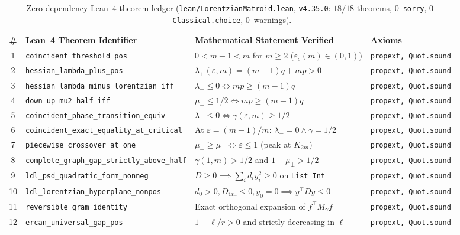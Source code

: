 \documentclass[11pt,a4paper]{article}
\theoremstyle{definition}
\theoremstyle{remark}
\begin{document}
\begin{table}[t]
\centering
\caption{Zero-dependency Lean~4 theorem ledger (\texttt{lean/LorentzianMatroid.lean}, \texttt{v4.35.0}: $18/18$ theorems, $0$~\texttt{sorry}, $0$~\texttt{Classical.choice}, $0$~warnings).}
\label{tab:lean}
\scriptsize
\setlength{\tabcolsep}{4pt}
\begin{tabular}{@{}clll@{}}
\toprule
\# & Lean~4 Theorem Identifier & Mathematical Statement Verified & Axioms \\
\midrule
1 & \texttt{coincident\_threshold\_pos} & $0 < m-1 < m$ for $m \ge 2$ ($\varepsilon_c(m) \in (0,1)$) & \texttt{propext, Quot.sound} \\
2 & \texttt{hessian\_lambda\_plus\_pos} & $\lambda_+(\varepsilon,m) = (m-1)q + mp > 0$ & \texttt{propext, Quot.sound} \\
3 & \texttt{hessian\_lambda\_minus\_lorentzian\_iff} & $\lambda_- \le 0 \iff mp \ge (m-1)q$ & \texttt{propext, Quot.sound} \\
4 & \texttt{down\_up\_mu2\_half\_iff} & $\mu_- \le 1/2 \iff mp \ge (m-1)q$ & \texttt{propext, Quot.sound} \\
5 & \texttt{coincident\_phase\_transition\_equiv} & $\lambda_- \le 0 \iff \gamma(\varepsilon,m) \ge 1/2$ & \texttt{propext, Quot.sound} \\
6 & \texttt{coincident\_exact\_equality\_at\_critical} & At $\varepsilon = (m-1)/m$: $\lambda_- = 0 \wedge \gamma = 1/2$ & \texttt{propext, Quot.sound} \\
7 & \texttt{piecewise\_crossover\_at\_one} & $\mu_- \ge \mu_\perp \iff \varepsilon \le 1$ (peak at $K_{2m}$) & \texttt{propext, Quot.sound} \\
8 & \texttt{complete\_graph\_gap\_strictly\_above\_half} & $\gamma(1,m) > 1/2$ and $1 - \mu_\perp > 1/2$ & \texttt{propext, Quot.sound} \\
9 & \texttt{ldl\_psd\_quadratic\_form\_nonneg} & $D \ge 0 \implies \sum_i d_i y_i^2 \ge 0$ on \texttt{List Int} & \texttt{propext, Quot.sound} \\
10 & \texttt{ldl\_lorentzian\_hyperplane\_nonpos} & $d_0 > 0, D_{\mathrm{tail}} \le 0, y_0 = 0 \implies y^\top D y \le 0$ & \texttt{propext, Quot.sound} \\
11 & \texttt{reversible\_gram\_identity} & Exact orthogonal expansion of $f^\top M_\gamma f$ & \texttt{propext, Quot.sound} \\
12 & \texttt{ercan\_universal\_gap\_pos} & $1 - \ell/r > 0$ and strictly decreasing in $\ell$ & \texttt{propext, Quot.sound} \\

\end{tabular}
\end{table}
\end{document}
